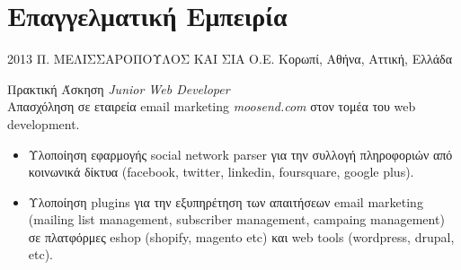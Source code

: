 \documentclass[print]{keros-cv} %
\begin{document}
\section{Επαγγελματική Εμπειρία}

\begin{entrylist}
\entry
{2013}
{Π. ΜΕΛΙΣΣΑΡΟΠΟΥΛΟΣ ΚΑΙ ΣΙΑ Ο.Ε.}
{Κορωπί, Αθήνα, Αττική, Ελλάδα}
{Πρακτική Άσκηση \emph{Junior Web Developer} \\
Απασχόληση σε εταιρεία email marketing \emph{moosend.com} στον τομέα
του web development.
\begin{itemize}
\item[] Υλοποίηση εφαρμογής social network parser για την συλλογή πληροφοριών από
κοινωνικά δίκτυα (facebook, twitter, linkedin, foursquare, google plus).
\item[] Υλοποίηση plugins για την εξυπηρέτηση των απαιτήσεων email marketing (mailing list management, subscriber management, campaing management) σε πλατφόρμες eshop (shopify, magento etc) και web tools (wordpress, drupal, etc).
\end{itemize}}
\end{entrylist}

\end{document}

